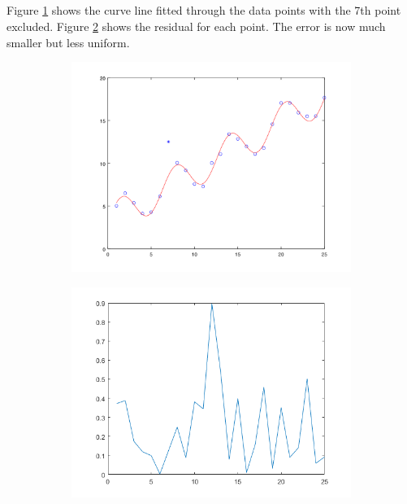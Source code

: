\documentclass[12pt]{article}
\begin{document}
\subsection{} %

Figure \ref{fig_3c_plot} shows the curve line fitted through the data points with the 7th point excluded. Figure \ref{fig_3c_r} shows the residual for each point. The error is now much smaller but less uniform.

\begin{figure}[t!]
    \begin{subfigure}[t]{0.5\textwidth}
        \centering
        \includegraphics[width=\linewidth]{plot_3c}
        \caption{}
        \label{fig_3c_plot}
    \end{subfigure}
    \begin{subfigure}[t]{0.5\textwidth}
        \centering
        \includegraphics[width=\linewidth]{plot_3c_r}
        \caption{}
        \label{fig_3c_r}
    \end{subfigure}
    \caption{}
    \label{fig_3c}
\end{figure}
\end{document}
